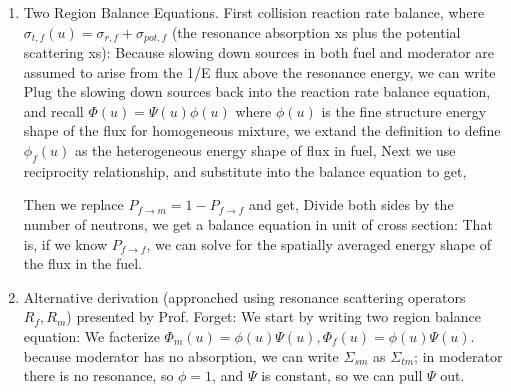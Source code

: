 \documentclass{school-22.211-notes}
\begin{document}
\begin{enumerate}
\item Two Region Balance Equations. 
First collision reaction rate balance, where $\sigma_{t,f}(u) = \sigma_{r,f} + \sigma_{pot, f}$ (the resonance absorption xs plus the potential scattering xs):
Because slowing down sources in both fuel and moderator are assumed to arise from the 1/E flux above the resonance energy, we can write
Plug the slowing down sources back into the reaction rate balance equation, and recall $\Phi(u) = \Psi(u) \phi(u)$ where $\phi(u)$ is the fine structure energy shape of the flux for homogeneous mixture, we extand the definition to define $\phi_f(u)$ as the heterogeneous energy shape of flux in fuel,
Next we use reciprocity relationship,
and substitute into the balance equation to get,

Then we replace $P_{f\to m} = 1 - P_{f\to f}$ and get, 
Divide both sides by the number of neutrons, we get a balance equation in unit of cross section:
That is, if we know $P_{f\to f}$, we can solve for the spatially averaged energy shape of the flux in the fuel. 


\item Alternative derivation (approached using resonance scattering operators $R_f, R_m$) presented by Prof. Forget: We start by writing two region balance equation: 
We facterize $\Phi_m(u) = \phi(u) \Psi(u), \Phi_f (u) = \phi(u) \Psi(u)$. 
because moderator has no absorption, we can write $\Sigma_{sm}$ as $\Sigma_{tm}$; in moderator there is no resonance, so $\phi = 1$, and $\Psi$ is constant, so we can pull $\Psi$ out. 


\end{enumerate}
\end{document}
